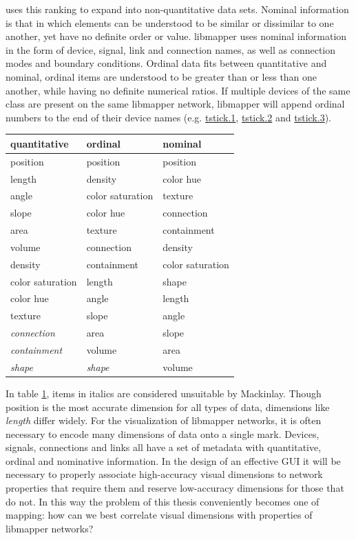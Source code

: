  uses this ranking to expand into non-quantitative data sets. Nominal information is that in which elements can be understood to be similar or dissimilar to one another, yet have no definite order or value. libmapper uses nominal information in the form of device, signal, link and connection names, as well as connection modes and boundary conditions. Ordinal data fits between quantitative and nominal, ordinal items are understood to be greater than or less than one another, while having no definite numerical ratios. If multiple devices of the same class are present on the same libmapper network, libmapper will append ordinal numbers to the end of their device names (e.g. \url{tstick.1}, \url{tstick.2} and \url{tstick.3}).

\begin{table}
\setlength{\tabcolsep}{12pt}
	\centering
	\label{tab:graphical_rankings}
		\begin{tabular}{l l l}
		\textbf{quantitative}&	\textbf{ordinal}	&	\textbf{nominal}\\
		\hline\hline
		position 			& 	position 			&	position 		\\
		length 				& 	density 			&	color hue 		\\
		angle 				& 	color saturation 	&	texture 		\\
		slope				&	color hue 			&	connection 		\\
		area				&	texture				&	containment 	\\
		volume				&	connection 			&	density 		\\
		density				&	containment 		&	color saturation\\
		color saturation	&	length 				&	shape 			\\
		color hue			&	angle 				&	length 			\\
		texture				&	slope 				&	angle 			\\
		\emph{connection}	&	area 				&	slope 			\\
		\emph{containment}	&	volume 				&	area 			\\
		\emph{shape}		&	\emph{shape} 		&	volume 			\\
		\hline
	\end{tabular}
\end{table}

In table \ref{tab:graphical_rankings}, items in italics are considered unsuitable by Mackinlay. Though position is the most accurate dimension for all types of data, dimensions like \emph{length} differ widely. For the visualization of libmapper networks, it is often necessary to encode many dimensions of data onto a single mark. Devices, signals, connections and links all have a set of metadata with quantitative, ordinal and nominative information. In the design of an effective GUI it will be necessary to properly associate high-accuracy visual dimensions to network properties that require them and reserve low-accuracy dimensions for those that do not. In this way the problem of this thesis conveniently becomes one of mapping: how can we best correlate visual dimensions with properties of libmapper networks?

